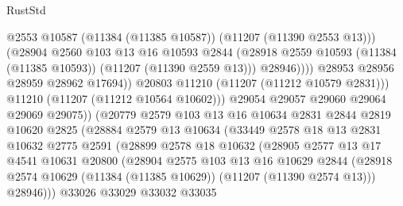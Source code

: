 \begin{lexlean}{RustStd}
\begin{coremodule}
                                  @2553
                                  @10587
                                  (@11384 (@11385 @10587))
                                  (@11207 (@11390 @2553 @13)))
                                (@28904
                                  @2560
                                  @103
                                  @13
                                  @16
                                  @10593
                                  @2844
                                  (@28918
                                    @2559
                                    @10593
                                    (@11384 (@11385 @10593))
                                    (@11207 (@11390 @2559 @13)))
                                  @28946))))
                          @28953
                          @28956
                          @28959
                          @28962
                          @17694))
                      @20803
                      @11210
                      (@11207 (@11212 @10579 @2831)))
                    @11210
                    (@11207 (@11212 @10564 @10602)))
                  @29054
                  @29057
                  @29060
                  @29064
                  @29069
                  @29075))
              (@20779
                @2579
                @103
                @13
                @16
                @10634
                @2831
                @2844
                @2819
                @10620
                @2825
                (@28884
                  @2579
                  @13
                  @10634
                  (@33449
                    @2578
                    @18
                    @13
                    @2831
                    @10632
                    @2775
                    @2591
                    (@28899
                      @2578
                      @18
                      @10632
                      (@28905
                        @2577
                        @13
                        @17
                        @4541
                        @10631
                        @20800
                        (@28904
                          @2575
                          @103
                          @13
                          @16
                          @10629
                          @2844
                          (@28918 @2574 @10629 (@11384 (@11385 @10629)) (@11207 (@11390 @2574 @13)))
                          @28946)))
                    @33026
                    @33029
                    @33032
                    @33035

\end{coremodule}
\end{lexlean}
